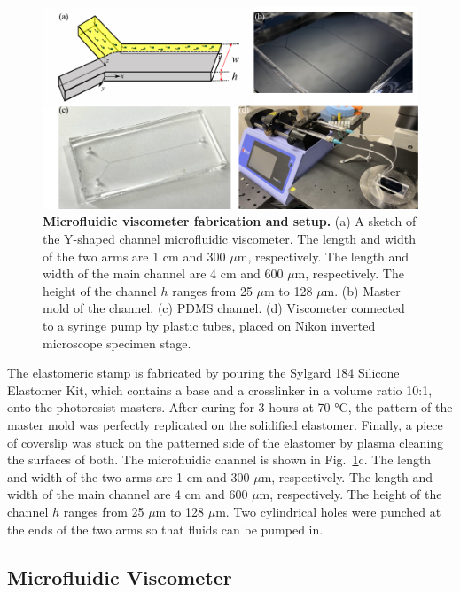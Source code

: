 \begin{figure}[hp]
	\begin{center}
	\includegraphics[width=5.5 in]{Figs/2-Exp/7.pdf}
	\end{center}
	\caption[Microfluidic Viscometer Fabrication and Setup.]
	{
	\textbf{Microfluidic viscometer fabrication and setup.}
	(a) A sketch of the Y-shaped channel microfluidic viscometer. The length and width of the two arms are 1 cm and 300 $\mu$m, respectively. The length and width of the main channel are 4 cm and 600 $\mu$m, respectively. The height of the channel $h$ ranges from 25 $\mu$m to 128 $\mu$m.
	(b) Master mold of the channel.
	(c) PDMS channel.
	(d) Viscometer connected to a syringe pump by plastic tubes, placed on Nikon inverted microscope specimen stage.
	}
	\label{fig:experiment-microfluidics}
\end{figure}

The elastomeric stamp is fabricated by pouring the Sylgard 184 Silicone Elastomer Kit, which contains a base and a crosslinker in a volume ratio 10:1, onto the photoresist masters. After curing for 3 hours at 70 °C, the pattern of the master mold was perfectly replicated on the solidified elastomer. Finally, a piece of coverslip was stuck on the patterned side of the elastomer by plasma cleaning the surfaces of both. The microfluidic channel is shown in Fig.~\ref{fig:experiment-microfluidics}c. The length and width of the two arms are 1 cm and 300 $\mu$m, respectively. The length and width of the main channel are 4 cm and 600 $\mu$m, respectively. The height of the channel $h$ ranges from 25 $\mu$m to 128 $\mu$m. Two cylindrical holes were punched at the ends of the two arms so that fluids can be pumped in.

\subsection{Microfluidic Viscometer}


